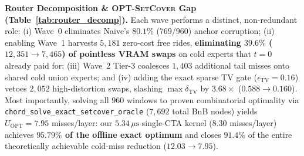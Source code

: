 \documentclass[10pt,twocolumn]{article}
\theoremstyle{definition}
\begin{document}
\vspace{2pt}
\noindent\textbf{Router Decomposition \& \textsc{OPT-SetCover} Gap (Table~\ref{tab:router_decomp}).}
Each wave performs a distinct, non-redundant role: (i) Wave~0 eliminates Naive's $80.1\%$ ($769/960$) anchor corruption; (ii) enabling Wave~1 harvests $5,181$ zero-cost free rides, \textbf{eliminating $39.6\%$ ($12,351 \to 7,465$) of pointless VRAM swaps} on cold experts that $t=0$ already paid for; (iii) Wave~2 Tier-3 coalesces $1,403$ additional tail misses onto shared cold union experts; and (iv) adding the exact sparse TV gate ($\epsilon_{\mathrm{TV}}=0.16$) vetoes $2,052$ high-distortion swaps, slashing $\max \delta_{\mathrm{TV}}$ by $3.68\times$ ($0.588 \to 0.160$). Most importantly, solving all $960$ windows to proven combinatorial optimality via \texttt{chord\_solve\_exact\_setcover\_oracle} ($7,692$ total BnB nodes) yields $U_{\mathrm{OPT}} = 7.95$ misses/layer: our $5.34\,\mu\text{s}$ single-CTA kernel ($8.30$ misses/layer) achieves \textbf{$95.79\%$ of the offline exact optimum} and closes \textbf{$91.4\%$} of the entire theoretically achievable cold-miss reduction ($12.03 \to 7.95$).

\begin{table}[t]
  \centering
  \caption{Per-layer offload makespan ($\mu$s) against legacy static \texttt{--pcie-frac} and offline exact Branch-and-Bound \textsc{OPT-Makespan} across $960$ real Qwen3-30B layer-windows under $50/50$ striped and $85/15$ NUMA-0 hotspot page placement.}
  \label{tab:sched_opt}
  \footnotesize
  \setlength{\tabcolsep}{2.8pt}
\end{table}
\end{document}
